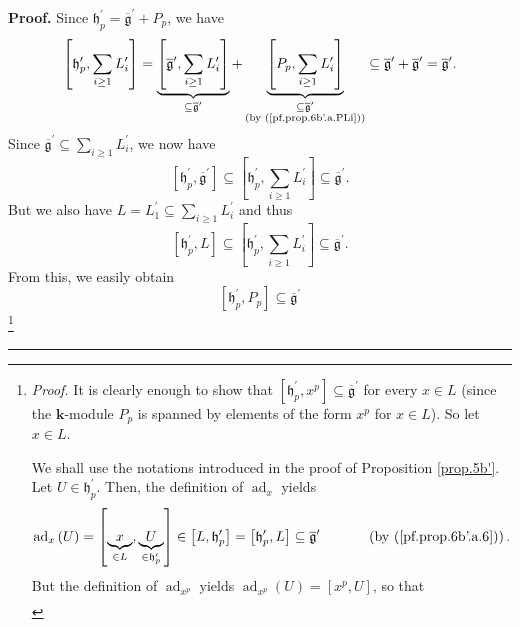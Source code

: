 \documentclass[numbers=enddot,12pt,final,onecolumn,notitlepage]{scrartcl}%
\theoremstyle{definition}
\newenvironment{proof}[1][Proof]{\noindent\textbf{#1.} }{\ \rule{0.5em}{0.5em}}
\let\sumnonlimits\sum
\renewcommand{\sum}{\sumnonlimits\limits}
\begin{document}
\begin{proof}
Since $\mathfrak{h}_{p}^{\prime}=\overline{\mathfrak{g}}^{\prime}+P_{p}$, we
have%
\[
\left[  \mathfrak{h}_{p}^{\prime},\sum_{i\geq1}L_{i}^{\prime}\right]
=\underbrace{\left[  \overline{\mathfrak{g}}^{\prime},\sum_{i\geq1}%
L_{i}^{\prime}\right]  }_{\subseteq\overline{\mathfrak{g}}^{\prime}%
}+\underbrace{\left[  P_{p},\sum_{i\geq1}L_{i}^{\prime}\right]  }%
_{\substack{\subseteq\overline{\mathfrak{g}}^{\prime}\\\text{(by
(\ref{pf.prop.6b'.a.PLi}))}}}\subseteq\overline{\mathfrak{g}}^{\prime
}+\overline{\mathfrak{g}}^{\prime}=\overline{\mathfrak{g}}^{\prime}.
\]
Since $\overline{\mathfrak{g}}^{\prime}\subseteq\sum_{i\geq1}L_{i}^{\prime}$,
we now have
\begin{equation}
\left[  \mathfrak{h}_{p}^{\prime},\overline{\mathfrak{g}}^{\prime}\right]
\subseteq\left[  \mathfrak{h}_{p}^{\prime},\sum_{i\geq1}L_{i}^{\prime}\right]
\subseteq\overline{\mathfrak{g}}^{\prime}. \label{pf.prop.6b'.a.4}%
\end{equation}
But we also have $L=L_{1}^{\prime}\subseteq\sum_{i\geq1}L_{i}^{\prime}$ and
thus%
\begin{equation}
\left[  \mathfrak{h}_{p}^{\prime},L\right]  \subseteq\left[  \mathfrak{h}%
_{p}^{\prime},\sum_{i\geq1}L_{i}^{\prime}\right]  \subseteq\overline
{\mathfrak{g}}^{\prime}. \label{pf.prop.6b'.a.6}%
\end{equation}
From this, we easily obtain%
\[
\left[  \mathfrak{h}_{p}^{\prime},P_{p}\right]  \subseteq\overline
{\mathfrak{g}}^{\prime}%
\]
\footnote{\textit{Proof.} It is clearly enough to show that $\left[
\mathfrak{h}_{p}^{\prime},x^{p}\right]  \subseteq\overline{\mathfrak{g}%
}^{\prime}$ for every $x\in L$ (since the $\mathbf{k}$-module $P_{p}$ is
spanned by elements of the form $x^{p}$ for $x\in L$). So let $x\in L$.
\par
We shall use the notations introduced in the proof of Proposition
\ref{prop.5b'}. Let $U\in\mathfrak{h}_{p}^{\prime}$. Then, the definition of
$\operatorname*{ad}\nolimits_{x}$ yields%
\[
\operatorname*{ad}\nolimits_{x}\left(  U\right)  =\left[  \underbrace{x}_{\in
L},\underbrace{U}_{\in\mathfrak{h}_{p}^{\prime}}\right]  \in\left[
L,\mathfrak{h}_{p}^{\prime}\right]  =\left[  \mathfrak{h}_{p}^{\prime
},L\right]  \subseteq\overline{\mathfrak{g}}^{\prime}%
\ \ \ \ \ \ \ \ \ \ \left(  \text{by (\ref{pf.prop.6b'.a.6})}\right)  .
\]
But the definition of $\operatorname*{ad}\nolimits_{x^{p}}$ yields
$\operatorname*{ad}\nolimits_{x^{p}}\left(  U\right)  =\left[  x^{p},U\right]
$, so that%
\begin{align*}

\end{align*}}
\end{proof}
\end{document}
